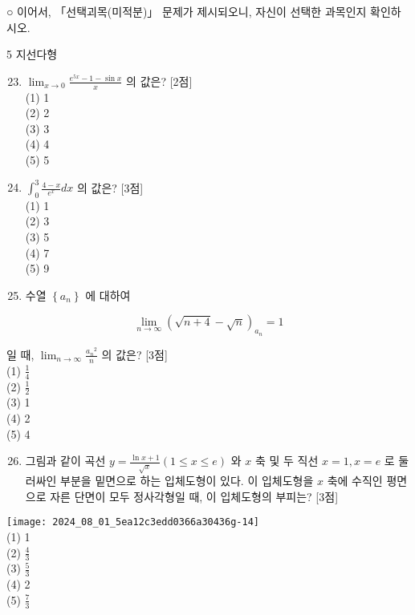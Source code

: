 \documentclass[10pt]{article}
\begin{document}
○ 이어서, 「선택괴목(미적분)」 문제가 제시되오니, 자신이 선택한 과목인지 확인하시오.

5 지선다형

\begin{enumerate}
  \setcounter{enumi}{22}
  \item $\lim _{x \rightarrow 0} \frac{e^{5 x}-1-\sin x}{x}$ 의 값은? [2점]\\
(1) 1\\
(2) 2\\
(3) 3\\
(4) 4\\
(5) 5

  \item $\int_{0}^{3} \frac{4-x}{e^{x}} d x$ 의 값은? [3점]\\
(1) 1\\
(2) 3\\
(3) 5\\
(4) 7\\
(5) 9

  \item 수열 $\left\{a_{n}\right\}$ 에 대하여

\end{enumerate}

\[
\lim _{n \rightarrow \infty}(\sqrt{n+4}-\sqrt{n})_{a_{n}}=1
\]

일 때, $\lim _{n \rightarrow \infty} \frac{a_{n}{ }^{2}}{n}$ 의 값은? [3점]\\
(1) $\frac{1}{4}$\\
(2) $\frac{1}{2}$\\
(3) 1\\
(4) 2\\
(5) 4

\begin{enumerate}
  \setcounter{enumi}{25}
  \item 그림과 같이 곡선 $y=\frac{\ln x+1}{\sqrt{x}}(1 \leq x \leq e)$ 와 $x$ 축 및 두 직선 $x=1, x=e$ 로 둘러싸인 부분을 밑면으로 하는 입체도형이 있다. 이 입체도형을 $x$ 축에 수직인 평면으로 자른 단면이 모두 정사각형일 때, 이 입체도형의 부피는? [3점]
\end{enumerate}

\texttt{[image: 2024\_08\_01\_5ea12c3edd0366a30436g-14]}\\
(1) 1\\
(2) $\frac{4}{3}$\\
(3) $\frac{5}{3}$\\
(4) 2\\
(5) $\frac{7}{3}$
\end{document}
